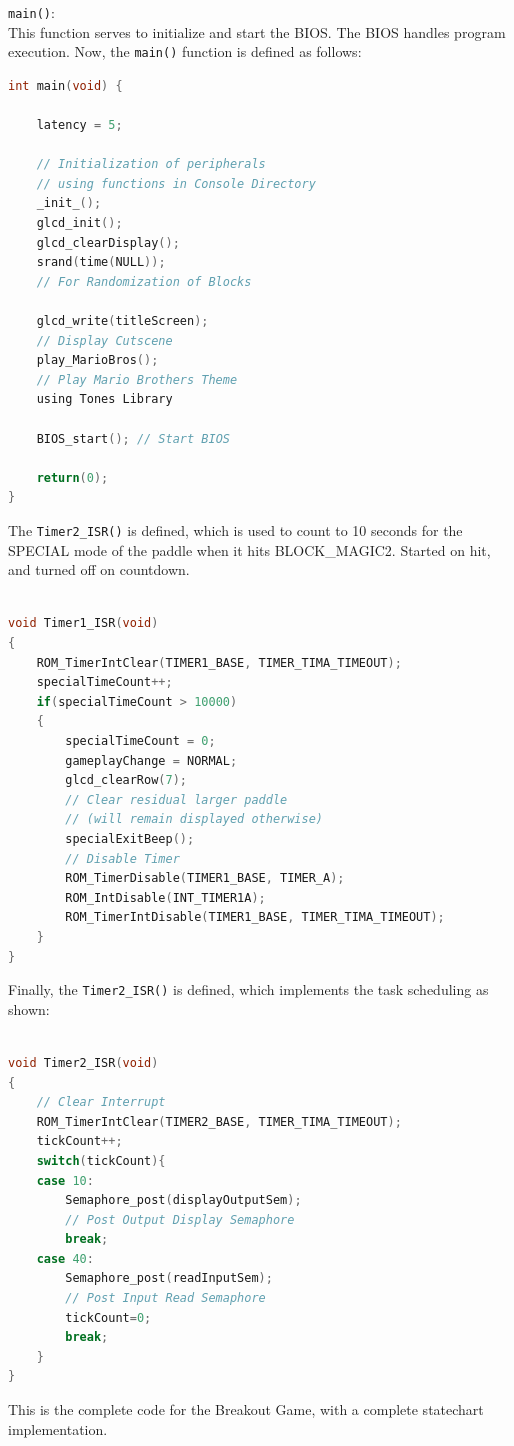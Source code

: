 \documentclass{article}
\begin{document}
\texttt{main()}: \\ This function serves to initialize and start the BIOS. The BIOS handles program execution. Now, the \texttt{main()} function is defined as follows:
      \begin{lstlisting}[basicstyle = \small, language = C]
int main(void) {

    latency = 5;

    // Initialization of peripherals 
    // using functions in Console Directory
    _init_();
    glcd_init();
    glcd_clearDisplay();
    srand(time(NULL)); 
    // For Randomization of Blocks

    glcd_write(titleScreen); 
    // Display Cutscene
    play_MarioBros(); 
    // Play Mario Brothers Theme
    using Tones Library

    BIOS_start(); // Start BIOS

    return(0);
}
  \end{lstlisting}
\qquad The \texttt{Timer2\_ISR()} is defined, which is used to count to 10 seconds for the SPECIAL mode of the paddle when it hits BLOCK\_MAGIC2. Started on hit, and turned off on countdown.\\ \\
      \begin{lstlisting}[basicstyle = \small, language = C]
void Timer1_ISR(void)
{
    ROM_TimerIntClear(TIMER1_BASE, TIMER_TIMA_TIMEOUT);
    specialTimeCount++;
    if(specialTimeCount > 10000)
    {
        specialTimeCount = 0;
        gameplayChange = NORMAL;
        glcd_clearRow(7); 
        // Clear residual larger paddle 
        // (will remain displayed otherwise)
        specialExitBeep();
        // Disable Timer
        ROM_TimerDisable(TIMER1_BASE, TIMER_A);
        ROM_IntDisable(INT_TIMER1A);
        ROM_TimerIntDisable(TIMER1_BASE, TIMER_TIMA_TIMEOUT);
    }
}
  \end{lstlisting}
\qquad Finally, the \texttt{Timer2\_ISR()} is defined, which implements the task scheduling as shown: \\ \\
      \begin{lstlisting}[basicstyle = \small, language = C]
void Timer2_ISR(void)
{
    // Clear Interrupt
    ROM_TimerIntClear(TIMER2_BASE, TIMER_TIMA_TIMEOUT);
    tickCount++;
    switch(tickCount){
    case 10:
        Semaphore_post(displayOutputSem); 
        // Post Output Display Semaphore
        break;
    case 40:
        Semaphore_post(readInputSem); 
        // Post Input Read Semaphore
        tickCount=0;
        break;
    }
}
  \end{lstlisting}
This is the complete code for the Breakout Game, with a complete statechart implementation.
\end{document}
